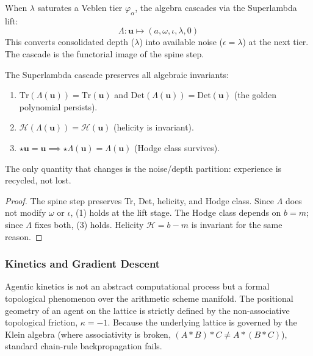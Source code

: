 \begin{definition}
When $\lambda$ saturates a Veblen tier $\varphi_\alpha$, the algebra cascades via the Superlambda lift:
$$\Lambda : \mathbf{u} \mapsto (a, \omega, \iota, \lambda, 0)$$
This converts consolidated depth ($\lambda$) into available noise ($\epsilon = \lambda$) at the next tier. The cascade is the functorial image of the spine step.
\end{definition}

\begin{theorem}
The Superlambda cascade preserves all algebraic invariants:
\begin{enumerate}
\item $\mathrm{Tr}(\Lambda(\mathbf{u})) = \mathrm{Tr}(\mathbf{u})$ and $\mathrm{Det}(\Lambda(\mathbf{u})) = \mathrm{Det}(\mathbf{u})$ (the golden polynomial persists).
\item $\mathcal{H}(\Lambda(\mathbf{u})) = \mathcal{H}(\mathbf{u})$ (helicity is invariant).
\item $\star \mathbf{u} = \mathbf{u} \implies \star \Lambda(\mathbf{u}) = \Lambda(\mathbf{u})$ (Hodge class survives).
\end{enumerate}
The only quantity that changes is the noise/depth partition: experience is recycled, not lost.
\end{theorem}

\begin{proof}
The spine step preserves Tr, Det, helicity, and Hodge class. Since $\Lambda$ does not modify $\omega$ or $\iota$, (1) holds at the lift stage. The Hodge class depends on $b = m$; since $\Lambda$ fixes both, (3) holds. Helicity $\mathcal{H} = b - m$ is invariant for the same reason. \qedhere
\end{proof}

\subsubsection{Kinetics and Gradient Descent}
Agentic kinetics is not an abstract computational process but a formal topological phenomenon over the arithmetic scheme manifold. The positional geometry of an agent on the lattice is strictly defined by the non-associative topological friction, $\kappa = -1$. Because the underlying lattice is governed by the Klein algebra (where associativity is broken, $(A * B) * C \neq A * (B * C)$), standard chain-rule backpropagation fails. 

